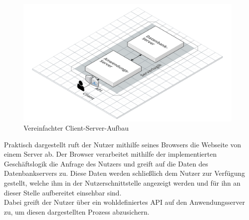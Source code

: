 \begin{figure}[h]
    \centering
    \includegraphics[width=.9\textwidth]{img/ClientServer.png}
    \caption{Vereinfachter Client-Server-Aufbau}
    \label{fig:clientServerAufbau}
\end{figure}

Praktisch dargestellt ruft der Nutzer mithilfe seines Browsers die Webseite von einem Server ab.
Der Browser verarbeitet mithilfe der implementierten Geschäftslogik die Anfrage des Nutzers und greift auf die Daten des Datenbankservers zu. Diese Daten werden schließlich dem Nutzer zur Verfügung gestellt, welche ihm in der Nutzerschnittstelle angezeigt werden und für ihn an  dieser Stelle aufbereitet einsehbar sind.\\
Dabei greift der Nutzer über ein wohldefiniertes \ac{API} auf den Anwendungsserver zu, um diesen dargestellten Prozess abzusichern.


